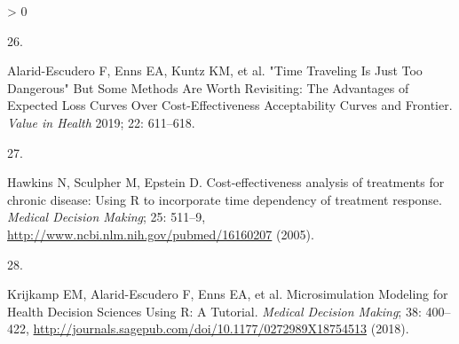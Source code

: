 \documentclass[
]{article}
\newlength{\cslhangindent}
\newlength{\csllabelwidth}
\newenvironment{CSLReferences}[2] %
 {%
  \setlength{\parindent}{0pt}
  \ifodd #1 \everypar{\setlength{\hangindent}{\cslhangindent}}\ignorespaces\fi
  \ifnum #2 > 0
  \setlength{\parskip}{#2\baselineskip}
  \fi
 }%
 {}
\newcommand{\CSLLeftMargin}[1]{\parbox[t]{\csllabelwidth}{#1}}
\newcommand{\CSLRightInline}[1]{\parbox[t]{\linewidth - \csllabelwidth}{#1}\break}
\begin{document}
\begin{CSLReferences}{0}{0}
\leavevmode\hypertarget{ref-Alarid-Escudero2019}{}%
\CSLLeftMargin{26. }
\CSLRightInline{Alarid-Escudero F, Enns EA, Kuntz KM, et al. {"Time Traveling Is Just Too Dangerous" But Some Methods Are Worth Revisiting: The Advantages of Expected Loss Curves Over Cost-Effectiveness Acceptability Curves and Frontier}. \emph{Value in Health} 2019; 22: 611--618.}

\leavevmode\hypertarget{ref-Hawkins2005}{}%
\CSLLeftMargin{27. }
\CSLRightInline{Hawkins N, Sculpher M, Epstein D. {Cost-effectiveness analysis of treatments for chronic disease: Using R to incorporate time dependency of treatment response.} \emph{Medical Decision Making}; 25: 511--9, \url{http://www.ncbi.nlm.nih.gov/pubmed/16160207} (2005).}

\leavevmode\hypertarget{ref-Krijkamp2018}{}%
\CSLLeftMargin{28. }
\CSLRightInline{Krijkamp EM, Alarid-Escudero F, Enns EA, et al. {Microsimulation Modeling for Health Decision Sciences Using R: A Tutorial}. \emph{Medical Decision Making}; 38: 400--422, \url{http://journals.sagepub.com/doi/10.1177/0272989X18754513} (2018).}

\end{CSLReferences}
\end{document}
